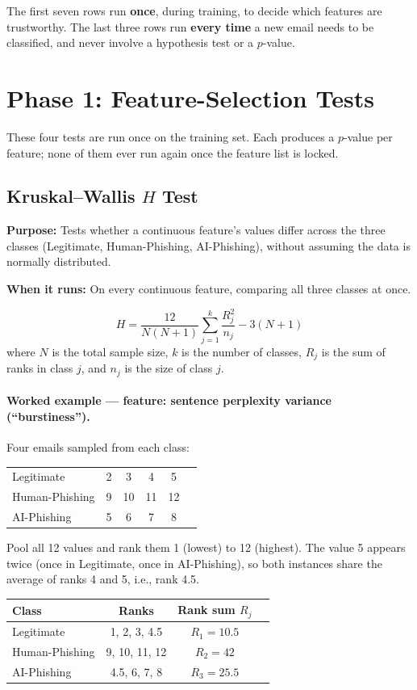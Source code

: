 \documentclass[11pt]{article}
\newcommand{\purpose}[1]{\par\noindent\textbf{Purpose:} #1\par}
\newcommand{\whenrun}[1]{\par\noindent\textbf{When it runs:} #1\par}
\begin{document}
The first seven rows run \textbf{once}, during training, to decide which features are trustworthy.
The last three rows run \textbf{every time} a new email needs to be classified, and never involve a
hypothesis test or a $p$-value.

\section{Phase 1: Feature-Selection Tests}
These four tests are run once on the training set. Each produces a $p$-value per feature; none of them
ever run again once the feature list is locked.

\subsection{Kruskal--Wallis $H$ Test}
\purpose{Tests whether a continuous feature's values differ across the three classes (Legitimate,
Human-Phishing, AI-Phishing), without assuming the data is normally distributed.}
\whenrun{On every continuous feature, comparing all three classes at once.}

\[
H = \frac{12}{N(N+1)} \sum_{j=1}^{k} \frac{R_j^2}{n_j} - 3(N+1)
\]
where $N$ is the total sample size, $k$ is the number of classes, $R_j$ is the sum of ranks in class
$j$, and $n_j$ is the size of class $j$.

\paragraph{Worked example --- feature: sentence perplexity variance (``burstiness'').}
Four emails sampled from each class:

\begin{center}
\begin{tabular}{lccccc}
\toprule
Legitimate & 2 & 3 & 4 & 5 & \\
Human-Phishing & 9 & 10 & 11 & 12 & \\
AI-Phishing & 5 & 6 & 7 & 8 & \\
\bottomrule
\end{tabular}
\end{center}

Pool all 12 values and rank them 1 (lowest) to 12 (highest). The value 5 appears twice (once in
Legitimate, once in AI-Phishing), so both instances share the average of ranks 4 and 5, i.e., rank 4.5.

\begin{center}
\begin{tabular}{lcccc}
\toprule
Class & Ranks & \multicolumn{2}{c}{Rank sum $R_j$} \\
\midrule
Legitimate & 1, 2, 3, 4.5 & \multicolumn{2}{c}{$R_1 = 10.5$} \\
Human-Phishing & 9, 10, 11, 12 & \multicolumn{2}{c}{$R_2 = 42$} \\
AI-Phishing & 4.5, 6, 7, 8 & \multicolumn{2}{c}{$R_3 = 25.5$} \\
\bottomrule
\end{tabular}
\end{center}
\end{document}
